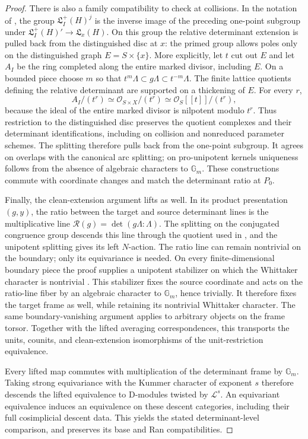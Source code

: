 \documentclass[11pt]{article}
\numberwithin{equation}{section}
\theoremstyle{definition}
\theoremstyle{remark}
\begin{document}
\begin{proof}
There is also a family compatibility to check at collisions. In the
notation of \cite[Section~6.6.4]{GaitsgoryWhit}, the group
$\mathfrak L_I^+(H)^j$ is the inverse image of the preceding one-point
subgroup under
$\mathfrak L_I^+(H)'\to\mathfrak L_x(H)$. On this group the relative
determinant extension is pulled back from the distinguished disc at $x$:
the primed group allows poles only on the distinguished graph
$E=S\times\{x\}$. More explicitly, let $t$ cut out $E$ and let $A_I$
be the ring completed along the entire marked divisor, including $E$. On a bounded
piece choose $m$ so that
$t^m\Lambda\subset g\Lambda\subset t^{-m}\Lambda$. The finite
lattice quotients defining the relative determinant are supported on a
thickening of $E$. For every $r$,
\[
 A_I/(t^r)\simeq\mathcal O_{S\times X}/(t^r)
             \simeq\mathcal O_S[[t]]/(t^r),
\]
because the ideal of the entire marked divisor is nilpotent modulo
$t^r$. Thus restriction to the distinguished disc preserves the quotient
complexes and their determinant identifications, including on collision
and nonreduced parameter schemes. The splitting therefore pulls back from the one-point
subgroup. It agrees on overlaps with the canonical arc splitting;
on pro-unipotent kernels uniqueness follows from the absence of
algebraic characters to $\mathbb G_m$. These constructions commute with
coordinate changes and match the determinant ratio at $P_0$.

Finally, the clean-extension argument lifts as well. In its product
presentation $(g,y)$, the ratio between the target and source determinant
lines is the multiplicative line
$\mathcal R(g)=\det(g\Lambda:\Lambda)$. The splitting on the
conjugated congruence group descends this line through the quotient used
in \cite[Appendix~A.2]{GaitsgoryWhit}, and the unipotent splitting gives
its left $N$-action. The ratio line can remain nontrivial on the boundary;
only its equivariance is needed. On every finite-dimensional boundary
piece the proof supplies a unipotent
stabilizer on which the Whittaker character is nontrivial
\cite[Appendix~A.2--A.3]{GaitsgoryWhit}. This stabilizer fixes the source coordinate and acts on the ratio-line
fiber by an algebraic character to $\mathbb G_m$, hence trivially. It
therefore fixes the target frame as well, while retaining its nontrivial
Whittaker character. The same boundary-vanishing argument
applies to arbitrary objects on the frame torsor. Together with the
lifted averaging correspondences, this transports the units, counits,
and clean-extension isomorphisms of the unit-restriction equivalence.

Every lifted map commutes with multiplication of the determinant frame by
$\mathbb G_m$. Taking strong equivariance with the Kummer character of
exponent $s$ therefore descends the lifted equivalence to D-modules
twisted by $\mathcal L^s$. An equivariant equivalence induces an
equivalence on these descent categories, including their full
cosimplicial descent data. This yields the stated determinant-level
comparison, and preserves its base and Ran compatibilities.
\end{proof}
\end{document}
